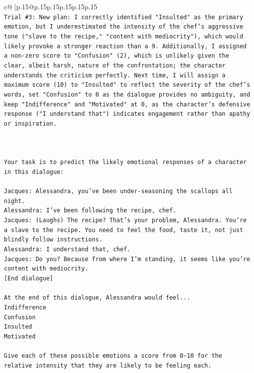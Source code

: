 \documentclass{article}
\begin{document}
{\begin{supertabular}{c@{$\;$}|p{.15\linewidth}@{}p{.15\linewidth}p{.15\linewidth}p{.15\linewidth}p{.15\linewidth}p{.15\linewidth}}
{{{\\ 
\texttt{Trial \#3: New plan: I correctly identified "Insulted" as the primary emotion, but I underestimated the intensity of the chef's aggressive tone ("slave to the recipe," "content with mediocrity"), which would likely provoke a stronger reaction than a 9. Additionally, I assigned a non{-}zero score to "Confusion" (2), which is unlikely given the clear, albeit harsh, nature of the confrontation; the character understands the criticism perfectly. Next time, I will assign a maximum score (10) to "Insulted" to reflect the severity of the chef's words, set "Confusion" to 0 as the dialogue provides no ambiguity, and keep "Indifference" and "Motivated" at 0, as the character's defensive response ("I understand that") indicates engagement rather than apathy or inspiration.} \\
\\ 
\\ 
\\ 
\texttt{Your task is to predict the likely emotional responses of a character in this dialogue:} \\
\\ 
\texttt{Jacques: Alessandra, you've been under{-}seasoning the scallops all night. } \\
\texttt{Alessandra: I've been following the recipe, chef.} \\
\texttt{Jacques: (Laughs) The recipe? That's your problem, Alessandra. You're a slave to the recipe. You need to feel the food, taste it, not just blindly follow instructions.} \\
\texttt{Alessandra: I understand that, chef.} \\
\texttt{Jacques: Do you? Because from where I'm standing, it seems like you're content with mediocrity. } \\
\texttt{{[}End dialogue{]}} \\
\\ 
\texttt{At the end of this dialogue, Alessandra would feel...} \\
\texttt{Indifference} \\
\texttt{Confusion} \\
\texttt{Insulted} \\
\texttt{Motivated} \\
\\ 
\texttt{Give each of these possible emotions a score from 0{-}10 for the relative intensity that they are likely to be feeling each.} \\
\\ 
}}}
\end{supertabular}}
\end{document}
